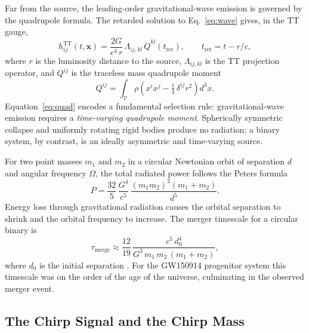 Far from the source, the leading-order gravitational-wave emission is governed by the quadrupole
formula. The retarded solution to Eq.~\eqref{eq:wave} gives, in the TT gauge,
\begin{equation}
	h_{ij}^{\mathrm{TT}}(t,\mathbf{x}) =
	\frac{2G}{c^{4}\,r}\,\Lambda_{ij,kl}\,
	\ddot{Q}^{kl}\!\left(t_{\mathrm{ret}}\right), \qquad t_{\mathrm{ret}} = t - r/c,
	\label{eq:quad}
\end{equation}
where $r$ is the luminosity distance to the source, $\Lambda_{ij,kl}$ is the TT projection
operator, and $Q^{ij}$ is the traceless mass quadrupole moment\cite{Maggiore2007}
\begin{equation}
	Q^{ij} = \int_{\mathcal{V}} \rho\!\left(x^i x^j - \tfrac{1}{3}\,\delta^{ij} r^2\right)d^3x.
\end{equation}
Equation~\eqref{eq:quad} encodes a fundamental selection rule: gravitational-wave emission
requires a \emph{time-varying quadrupole moment}. Spherically symmetric collapse and uniformly
rotating rigid bodies produce no radiation; a binary system, by contrast, is an ideally
asymmetric and time-varying source.

For two point masses $m_1$ and $m_2$ in a circular Newtonian orbit of separation $d$ and
angular frequency $\Omega$, the total radiated power follows the Peters formula
\begin{equation}
	P = \frac{32}{5}\,\frac{G^4}{c^5}\,
	\frac{(m_1 m_2)^2(m_1+m_2)}{d^5}.
	\label{eq:peters}
\end{equation}
Energy loss through gravitational radiation causes the orbital separation to shrink and the
orbital frequency to increase. The merger timescale for a circular binary is
\begin{equation}
	\tau_{\mathrm{merge}} \approx
	\frac{12}{19}\,\frac{c^5\,d_0^4}{G^3\,m_1\,m_2\,(m_1+m_2)},
\end{equation}
where $d_0$ is the initial separation \cite{Maggiore2007}. For the GW150914 progenitor system this timescale was on
the order of the age of the universe, culminating in the observed merger event.

\subsection*{The Chirp Signal and the Chirp Mass}

